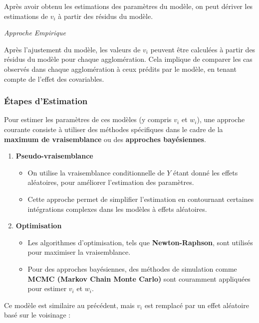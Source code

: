 \documentclass[
]{article}
\providecommand{\tightlist}{%
  \setlength{\itemsep}{0pt}\setlength{\parskip}{0pt}}
\begin{document}
Après avoir obtenu les estimations des paramètres du modèle, on peut
dériver les estimations de \(v_i\) à partir des résidus du modèle.

\emph{Approche Empirique}

Après l'ajustement du modèle, les valeurs de \(v_i\) peuvent être
calculées à partir des résidus du modèle pour chaque agglomération. Cela
implique de comparer les cas observés dans chaque agglomération à ceux
prédits par le modèle, en tenant compte de l'effet des covariables.

\subsubsection{Étapes d'Estimation}\label{uxe9tapes-destimation}

Pour estimer les paramètres de ces modèles (y compris \(v_i\) et
\(w_i\)), une approche courante consiste à utiliser des méthodes
spécifiques dans le cadre de la \textbf{maximum de vraisemblance} ou des
\textbf{approches bayésiennes}.

\begin{enumerate}
\def\labelenumi{\arabic{enumi}.}
\tightlist
\item
  \textbf{Pseudo-vraisemblance}

  \begin{itemize}
  \tightlist
  \item
    On utilise la vraisemblance conditionnelle de \(Y\) étant donné les
    effets aléatoires, pour améliorer l'estimation des paramètres.
  \item
    Cette approche permet de simplifier l'estimation en contournant
    certaines intégrations complexes dans les modèles à effets
    aléatoires.
  \end{itemize}
\item
  \textbf{Optimisation}

  \begin{itemize}
  \tightlist
  \item
    Les algorithmes d'optimisation, tels que \textbf{Newton-Raphson},
    sont utilisés pour maximiser la vraisemblance.
  \item
    Pour des approches bayésiennes, des méthodes de simulation comme
    \textbf{MCMC (Markov Chain Monte Carlo)} sont couramment appliquées
    pour estimer \(v_i\) et \(w_i\).
  \end{itemize}
\end{enumerate}

Ce modèle est similaire au précédent, mais \(v_i\) est remplacé par un
effet aléatoire basé sur le voisinage :
\end{document}

